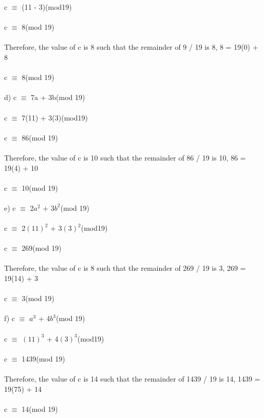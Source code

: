 \documentclass{article}
\begin{document}
c $\equiv$ (11 - 3)(mod19)\\\\
c $\equiv$ 8(mod 19) \\\\
Therefore, the value of c is 8 such that the remainder of 9 / 19 is 8,  8 = 19(0) + 8 \\\\
c $\equiv$ 8(mod 19) \\\\
d) c $\equiv$ 7a + 3b(mod 19) \\\\
c $\equiv$ 7(11) + 3(3)(mod19)\\\\
c $\equiv$ 86(mod 19) \\\\
Therefore, the value of c is 10 such that the remainder of 86 / 19 is 10,  86 = 19(4) + 10 \\\\
c $\equiv$ 10(mod 19) \\\\
e) c $\equiv$ 2$a^2$ + 3$b^2$(mod 19) \\\\
c $\equiv$ 2$(11)^2$ + 3$(3)^2$(mod19)\\\\
c $\equiv$ 269(mod 19) \\\\
Therefore, the value of c is 8 such that the remainder of 269 / 19 is 3,  269 = 19(14) + 3 \\\\
c $\equiv$ 3(mod 19) \\\\
f) c $\equiv$ $a^3$ + 4$b^3$(mod 19) \\\\
c $\equiv$ $(11)^3$ + 4$(3)^3$(mod19)\\\\
c $\equiv$ 1439(mod 19) \\\\
Therefore, the value of c is 14 such that the remainder of 1439 / 19 is 14,  1439 = 19(75) + 14 \\\\
c $\equiv$ 14(mod 19) \\\\
\newpage
\end{document}
